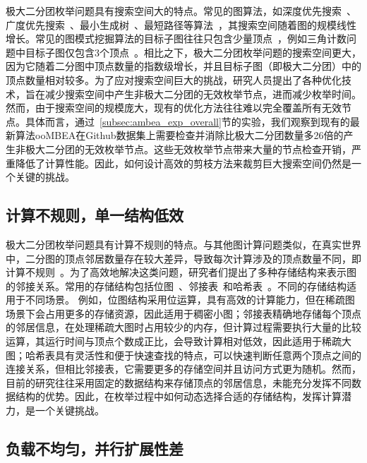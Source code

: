极大二分团枚举问题具有搜索空间大的特点。常见的图算法，如深度优先搜索~\cite{wiki-dfs}、广度优先搜索~\cite{wiki-bfs}、最小生成树~\cite{wiki-mst}、最短路径等算法~\cite{wiki-sssp}，其搜索空间随着图的规模线性增长。常见的图模式挖掘算法的目标子图往往只包含少量顶点~\cite{peregrine20,pangolin20,g2miner22,decomine22,khuzdul23,gamma23,Graphset23}，例如三角计数问题中目标子图仅包含3个顶点~\cite{triangle18}。相比之下，极大二分团枚举问题的搜索空间更大，因为它随着二分图中顶点数量的指数级增长，并且目标子图（即极大二分团）中的顶点数量相对较多。为了应对搜索空间巨大的挑战，研究人员提出了各种优化技术，旨在减少搜索空间中产生非极大二分团的无效枚举节点，进而减少枚举时间。然而，由于搜索空间的规模庞大，现有的优化方法往往难以完全覆盖所有无效节点。具体而言，通过~\ref{subsec:ambea_exp_overall}节的实验，我们观察到现有的最新算法ooMBEA在Github数据集上需要检查并消除比极大二分团数量多26倍的产生非极大二分团的无效枚举节点。这些无效枚举节点带来大量的节点检查开销，严重降低了计算性能。因此，如何设计高效的剪枝方法来裁剪巨大搜索空间仍然是一个关键的挑战。


\subsection{计算不规则，单一结构低效}

极大二分团枚举问题具有计算不规则的特点。与其他图计算问题类似，在真实世界中，二分图的顶点邻居数量存在较大差异，导致每次计算涉及的顶点数量不同，即计算不规则~\cite{Irregularity12}。为了高效地解决这类问题，研究者们提出了多种存储结构来表示图的邻接关系。常用的存储结构包括位图~\cite{lcm04,lcmmbc07,FCA15,FCA21,FCA22}、邻接表~\cite{iMBEA14,PMBE20,ooMBE22}和哈希表~\cite{parMBE18}。不同的存储结构适用于不同场景。
例如，位图结构采用位运算，具有高效的计算能力，但在稀疏图场景下会占用更多的存储资源，因此适用于稠密小图；邻接表精确地存储每个顶点的邻居信息，在处理稀疏大图时占用较少的内存，但计算过程需要执行大量的比较运算，其运行时间与顶点个数成正比，会导致计算相对低效，因此适用于稀疏大图；哈希表具有灵活性和便于快速查找的特点，可以快速判断任意两个顶点之间的连接关系，但相比邻接表，它需要更多的存储空间并且访问方式更为随机。然而，目前的研究往往采用固定的数据结构来存储顶点的邻居信息，未能充分发挥不同数据结构的优势。因此，在枚举过程中如何动态选择合适的存储结构，发挥计算潜力，是一个关键挑战。



\subsection{负载不均匀，并行扩展性差}

